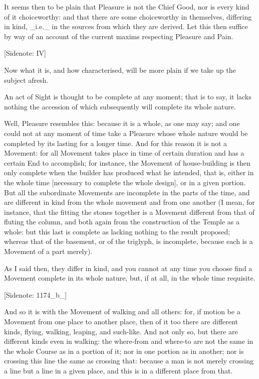 It seems then to be plain that Pleasure is not the Chief Good, nor is
every kind of it choiceworthy: and that there are some choiceworthy in
themselves, differing in kind, _i.e._ in the sources from which they
are derived. Let this then suffice by way of an account of the current
maxims respecting Pleasure and Pain.

[Sidenote: IV]

Now what it is, and how characterised, will be more plain if we take up
the subject afresh.

An act of Sight is thought to be complete at any moment; that is to say,
it lacks nothing the accession of which subsequently will complete its
whole nature.

Well, Pleasure resembles this: because it is a whole, as one may say;
and one could not at any moment of time take a Pleasure whose whole
nature would be completed by its lasting for a longer time. And for this
reason it is not a Movement: for all Movement takes place in time of
certain duration and has a certain End to accomplish; for instance, the
Movement of house-building is then only complete when the builder has
produced what he intended, that is, either in the whole time [necessary
to complete the whole design], or in a given portion. But all the
subordinate Movements are incomplete in the parts of the time, and are
different in kind from the whole movement and from one another (I
mean, for instance, that the fitting the stones together is a Movement
different from that of fluting the column, and both again from the
construction of the Temple as a whole: but this last is complete as
lacking nothing to the result proposed; whereas that of the basement,
or of the triglyph, is incomplete, because each is a Movement of a part
merely).

As I said then, they differ in kind, and you cannot at any time you
choose find a Movement complete in its whole nature, but, if at all, in
the whole time requisite.

[Sidenote: 1174_b_]

And so it is with the Movement of walking and all others: for, if motion
be a Movement from one place to another place, then of it too there are
different kinds, flying, walking, leaping, and such-like. And not only
so, but there are different kinds even in walking: the where-from and
where-to are not the same in the whole Course as in a portion of it;
nor in one portion as in another; nor is crossing this line the same as
crossing that: because a man is not merely crossing a line but a line in
a given place, and this is in a different place from that.


